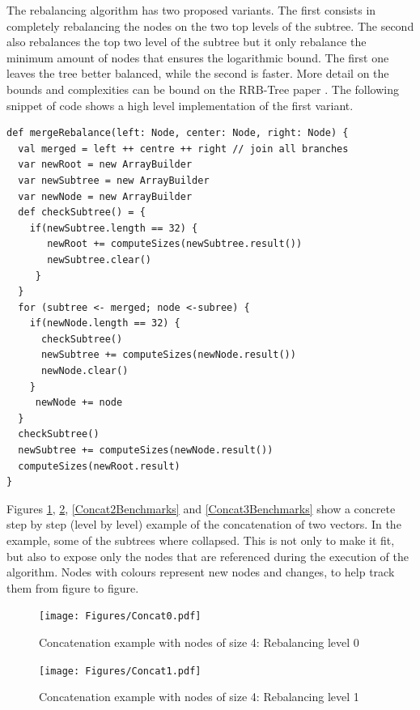 The rebalancing algorithm has two proposed variants. The first consists in completely rebalancing the nodes on the two top levels of the subtree. The second also rebalances the top two level of the subtree but it only rebalance the minimum amount of nodes that ensures the logarithmic bound. The first one leaves the tree better balanced, while the second is faster. More detail on the bounds and complexities can be bound on the RRB-Tree paper \cite{RRBTrees}. The following snippet of code shows a high level implementation of the first variant.

\begin{lstlisting}[frame=single]
def mergeRebalance(left: Node, center: Node, right: Node) {
  val merged = left ++ centre ++ right // join all branches
  var newRoot = new ArrayBuilder
  var newSubtree = new ArrayBuilder
  var newNode = new ArrayBuilder
  def checkSubtree() = {
    if(newSubtree.length == 32) {
       newRoot += computeSizes(newSubtree.result())
       newSubtree.clear()
     }
  }
  for (subtree <- merged; node <-subree) {
    if(newNode.length == 32) {
      checkSubtree()
      newSubtree += computeSizes(newNode.result())
      newNode.clear()
    } 
     newNode += node
  }
  checkSubtree()
  newSubtree += computeSizes(newNode.result())
  computeSizes(newRoot.result)
}

\end{lstlisting}

Figures \ref{Concat0Benchmarks}, \ref{Concat1Benchmarks}, \ref{Concat2Benchmarks} and \ref{Concat3Benchmarks} show a concrete step by step (level by level) example of the concatenation of two vectors. In the example, some of the subtrees where collapsed. This is not only to make it fit, but also to expose only the nodes that are referenced during the execution of the algorithm. Nodes with colours represent new nodes and changes, to help track them from figure to figure.

\begin{figure}[h!]
  \centering
  \texttt{[image: Figures/Concat0.pdf]}
  \caption{Concatenation example with nodes of size 4: Rebalancing level 0}
  \label{Concat0Benchmarks}
\end{figure}

\begin{figure}[h!]
  \centering
  \texttt{[image: Figures/Concat1.pdf]}
  \caption{Concatenation example with nodes of size 4: Rebalancing level 1}
  \label{Concat1Benchmarks}
\end{figure}

